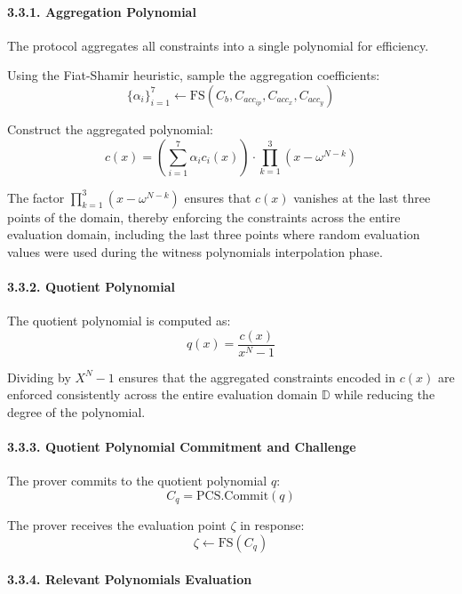 \documentclass[
]{article}
\begin{document}
\hypertarget{aggregation-polynomial}{%
\paragraph{3.3.1. Aggregation Polynomial}\label{aggregation-polynomial}}

The protocol aggregates all constraints into a single polynomial for
efficiency.

Using the Fiat-Shamir heuristic, sample the aggregation coefficients:
\[\{\alpha_i\}_{i=1}^7 \leftarrow \text{FS}(C_b, C_{acc_{ip}}, C_{acc_x}, C_{acc_y})\]

Construct the aggregated polynomial:
\[c(x) = \left(\sum_{i=1}^7 \alpha_i c_i(x)\right) \cdot \prod_{k=1}^3 \left(x - \omega^{N-k}\right)\]

The factor \(\prod_{k=1}^3 \left(x - \omega^{N-k}\right)\) ensures that
\(c(x)\) vanishes at the last three points of the domain, thereby
enforcing the constraints across the entire evaluation domain, including
the last three points where random evaluation values were used during
the witness polynomials interpolation phase.

\hypertarget{quotient-polynomial}{%
\paragraph{3.3.2. Quotient Polynomial}\label{quotient-polynomial}}

The quotient polynomial is computed as: \[q(x) = \frac{c(x)}{x^N - 1}\]

Dividing by \(X^N - 1\) ensures that the aggregated constraints encoded
in \(c(x)\) are enforced consistently across the entire evaluation
domain \(\mathbb{D}\) while reducing the degree of the polynomial.

\hypertarget{quotient-polynomial-commitment-and-challenge}{%
\paragraph{3.3.3. Quotient Polynomial Commitment and
Challenge}\label{quotient-polynomial-commitment-and-challenge}}

The prover commits to the quotient polynomial \(q\):
\[C_q = \text{PCS.Commit}(q)\]

The prover receives the evaluation point \(\zeta\) in response:
\[\zeta \leftarrow \text{FS}(C_q)\]

\hypertarget{relevant-polynomials-evaluation}{%
\paragraph{3.3.4. Relevant Polynomials
Evaluation}\label{relevant-polynomials-evaluation}}
\end{document}
